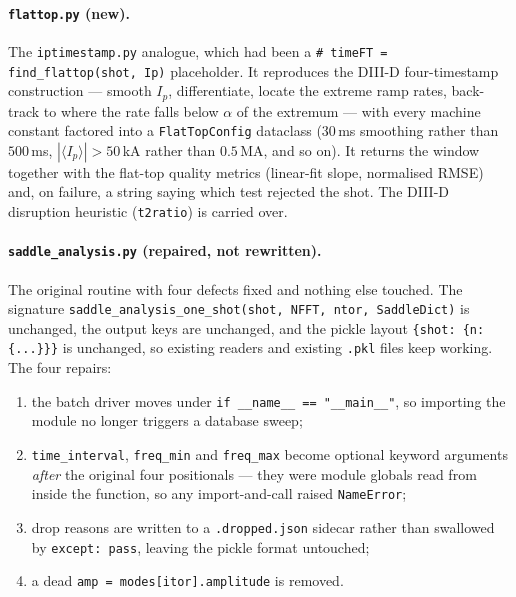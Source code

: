 \documentclass[11pt,a4paper]{article}
\newcommand{\code}[1]{\texttt{\small #1}}
\newcommand{\bk}{\discretionary{}{}{}}   %
\begin{document}
\paragraph{\code{flattop.py} (new).} The \code{iptimestamp.py} analogue, which had been a
\code{\# timeFT = \bk find\_flattop(shot, Ip)} placeholder. It reproduces the DIII-D
four-timestamp construction --- smooth $I_p$, differentiate, locate the extreme ramp rates,
back-track to where the rate falls below $\alpha$ of the extremum --- with every machine
constant factored into a \code{FlatTopConfig} dataclass ($30$\,ms smoothing rather than
$500$\,ms, $|\langle I_p\rangle| > 50$\,kA rather than $0.5$\,MA, and so on). It returns
the window together with the flat-top quality metrics (linear-fit slope, normalised RMSE)
and, on failure, a string saying which test rejected the shot. The DIII-D disruption
heuristic (\code{t2ratio}) is carried over.

\paragraph{\code{saddle\_analysis.py} (repaired, not rewritten).} The original routine with
four defects fixed and nothing else touched. The signature
\code{saddle\_analysis\_one\_shot(shot, NFFT, ntor, SaddleDict)} is unchanged, the output
keys are unchanged, and the pickle layout \code{\{shot: \{n: \{...\}\}\}} is unchanged, so
existing readers and existing \code{.pkl} files keep working. The four repairs:
\begin{enumerate}[leftmargin=2em,noitemsep]
\item the batch driver moves under \code{if \_\_name\_\_ == "\_\_main\_\_"}, so importing the
module no longer triggers a database sweep;
\item \code{time\_interval}, \code{freq\_min} and \code{freq\_max} become optional keyword
arguments \emph{after} the original four positionals --- they were module globals read from
inside the function, so any import-and-call raised \code{NameError};
\item drop reasons are written to a \code{.dropped.json} sidecar rather than swallowed by
\code{except: pass}, leaving the pickle format untouched;
\item a dead \code{amp = modes[itor].amplitude} is removed.
\end{enumerate}
\end{document}
